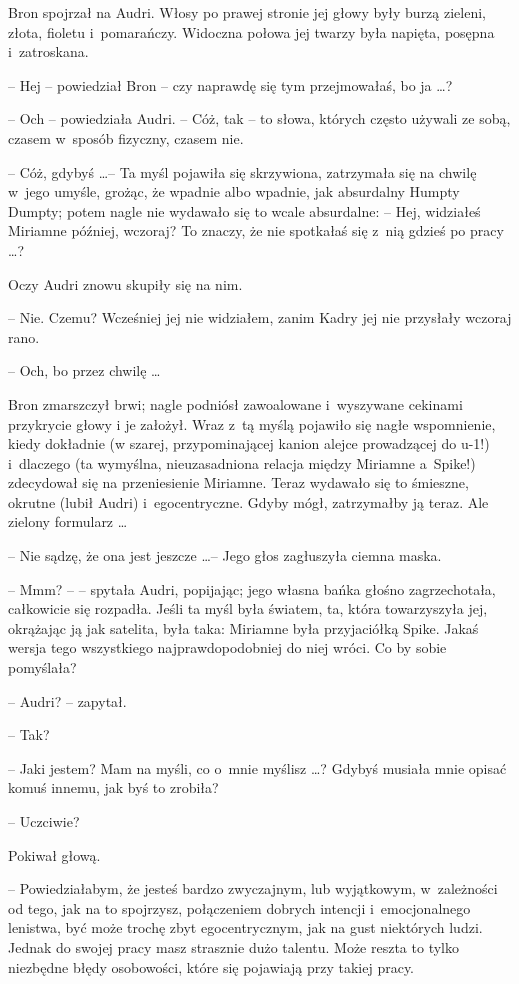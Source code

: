 \documentclass[oneside,polish,11pt,rmheadings]{mwbk}
\begin{document}
Bron spojrzał na Audri. Włosy po prawej stronie jej głowy były burzą zieleni, złota, fioletu i~pomarańczy. Widoczna połowa jej twarzy była napięta, posępna i~zatroskana. 

-- Hej -- powiedział Bron -- czy naprawdę się tym przejmowałaś, bo ja \ldots ? 

-- Och -- powiedziała Audri. -- Cóż, tak -- to słowa, których często używali ze sobą, czasem w~sposób fizyczny, czasem nie. 

-- Cóż, gdybyś \ldots  -- Ta myśl pojawiła się skrzywiona, zatrzymała się na chwilę w~jego umyśle, grożąc, że wpadnie albo wpadnie, jak absurdalny Humpty Dumpty; potem nagle nie wydawało się to wcale absurdalne: -- Hej, widziałeś Miriamne później, wczoraj? To znaczy, że nie spotkałaś się z~nią gdzieś po pracy \ldots ? 

Oczy Audri znowu skupiły się na nim. 

-- Nie. Czemu? Wcześniej jej nie widziałem, zanim Kadry jej nie przysłały wczoraj rano. 

-- Och, bo przez chwilę \ldots  

Bron zmarszczył brwi; nagle podniósł zawoalowane i~wyszywane cekinami przykrycie głowy   i je założył. Wraz z~tą myślą pojawiło się nagłe wspomnienie, kiedy dokładnie (w szarej, przypominającej kanion alejce prowadzącej do u-1!) i~dlaczego (ta wymyślna, nieuzasadniona relacja między Miriamne a~Spike!) zdecydował się na przeniesienie Miriamne. Teraz wydawało się to śmieszne, okrutne (lubił Audri) i~egocentryczne. Gdyby mógł, zatrzymałby ją teraz. Ale zielony formularz \ldots  

-- Nie sądzę, że ona jest jeszcze \ldots  -- Jego głos zagłuszyła ciemna maska.  

-- Mmm? -- -- spytała Audri, popijając; jego własna bańka głośno zagrzechotała, całkowicie się rozpadła. Jeśli ta myśl była światem, ta, która towarzyszyła jej, okrążając ją jak satelita, była taka: Miriamne była przyjaciółką Spike. Jakaś wersja tego wszystkiego najprawdopodobniej do niej wróci. Co by sobie pomyślała? 

-- Audri? -- zapytał. 

-- Tak? 

-- Jaki jestem? Mam na myśli, co o~mnie myślisz \ldots ? Gdybyś musiała mnie opisać komuś innemu, jak byś to zrobiła? 

-- Uczciwie? 

Pokiwał głową. 

-- Powiedziałabym, że jesteś bardzo zwyczajnym, lub wyjątkowym, w~zależności od tego, jak na to spojrzysz, połączeniem dobrych intencji i~emocjonalnego lenistwa, być może trochę zbyt egocentrycznym, jak na gust niektórych ludzi. Jednak do swojej pracy masz strasznie dużo talentu. Może reszta to tylko niezbędne błędy osobowości, które się pojawiają przy takiej pracy. 
\end{document}
